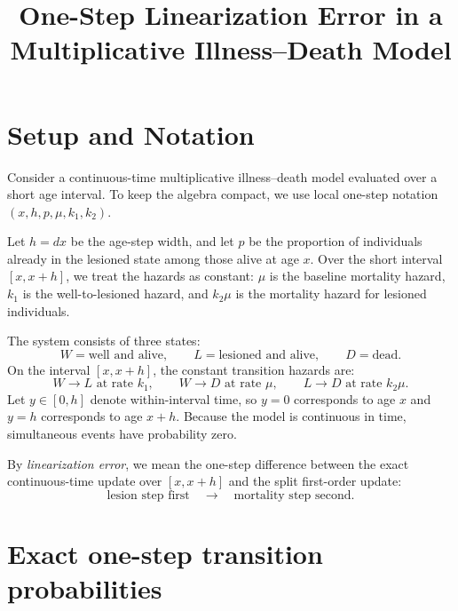 \documentclass{article}
\begin{document}
\title{One-Step Linearization Error in a Multiplicative Illness--Death Model}
\author{}
\date{}
\maketitle

\section*{Setup and Notation}

Consider a continuous-time multiplicative illness--death model evaluated over a short age interval. To keep the algebra compact, we use local one-step notation \((x,h,p,\mu,k_1,k_2)\). 

Let \(h=dx\) be the age-step width, and let \(p\) be the proportion of individuals already in the lesioned state among those alive at age \(x\). Over the short interval \([x,x+h]\), we treat the hazards as constant: \(\mu\) is the baseline mortality hazard, \(k_1\) is the well-to-lesioned hazard, and \(k_2\mu\) is the mortality hazard for lesioned individuals.

The system consists of three states:
\[
W=\text{well and alive},\qquad
L=\text{lesioned and alive},\qquad
D=\text{dead}.
\]
On the interval \([x,x+h]\), the constant transition hazards are:
\[
W\to L \text{ at rate } k_1,\qquad
W\to D \text{ at rate } \mu,\qquad
L\to D \text{ at rate } k_2\mu.
\]
Let \(y\in[0,h]\) denote within-interval time, so \(y=0\) corresponds to age \(x\) and \(y=h\) corresponds to age \(x+h\). Because the model is continuous in time, simultaneous events have probability zero.

By \emph{linearization error}, we mean the one-step difference between the exact continuous-time update over \([x,x+h]\) and the split first-order update:
\[
\text{lesion step first}
\quad \longrightarrow \quad
\text{mortality step second}.
\]

\section*{Exact one-step transition probabilities}
\end{document}
